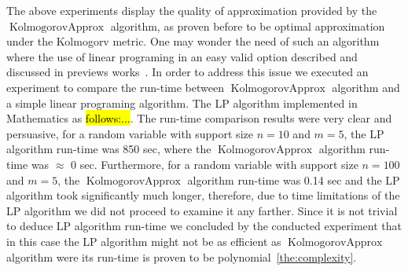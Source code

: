 \documentclass{article}
\DeclareMathOperator{\Trim}{Trim}
\DeclareMathOperator{\KlmApprox}{KolmogorovApprox}
\begin{document}
The above experiments display the quality of approximation provided by the $\KlmApprox$ algorithm, as proven before to be optimal approximation under the Kolmogorv metric. One may wonder the need of such an algorithm where the use of linear programing in an easy valid option described and discussed in previews works~\cite{pavlikov2016cvar}. In order to address this issue we executed an experiment to compare the run-time between $\KlmApprox$ algorithm and a simple linear programing algorithm. The LP algorithm implemented in Mathematics as \hl{follows:...}. The run-time comparison results were very clear and persuasive, for a random variable with support size $n=10$ and $m=5$, the LP algorithm run-time was 850 sec, where the $\KlmApprox$ algorithm run-time was $\approx$ 0 sec. Furthermore, for a random variable with support size $n=100$ and $m=5$, the $\KlmApprox$ algorithm run-time was 0.14 sec and the LP algorithm took significantly much longer, therefore, due to time limitations of the LP algorithm we did not proceed to examine it any farther.
Since it is not trivial to deduce LP algorithm run-time we concluded by the conducted experiment that in this case the LP algorithm might not be as efficient as $\KlmApprox$ algorithm were its run-time is proven to be polynomial~\ref{the:complexity}.




{}

\end{document}
